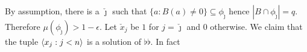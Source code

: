 \documentclass[combinatorics.tex]{subfiles}
\begin{document}
% 
% 
By assumption, there is a $\check\jmath$ such that $\big\{a:B(a)\neq0\big\}\subseteq\phi_{\check\jmath}$ hence $|B\cap\phi_{\check\jmath}|=q$.
Therefore $\mu(\phi_{\check\jmath})>1-\epsilon$.
Let $\check x_j$ be $1$ for $j=\check\jmath$ and $0$ otherwise.
We claim that the tuple $\langle x_j:j<n\rangle$ is a solution of $\flat\flat$.
In fact
% 
% 
\end{document}
